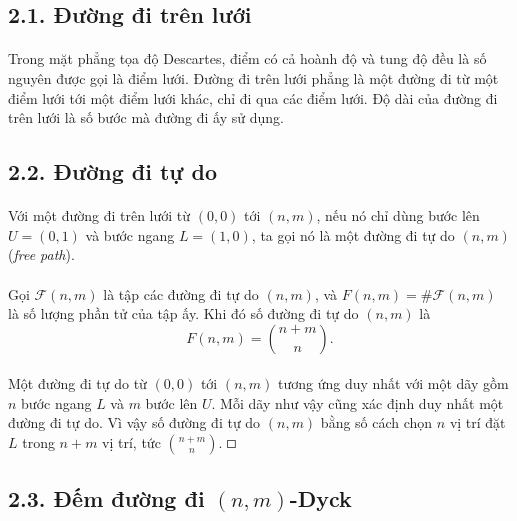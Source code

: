 \documentclass[11pt]{article}
\newcommand{\square}{\mathord{\vcenter{\hrule height .5pt
  \hbox{\vrule width .5pt height 5pt\kern5pt\vrule width .5pt}
  \hrule height .5pt}}}
\begin{document}
\subsection*{2.1. Đường đi trên lưới}

\paragraph{}
Trong mặt phẳng tọa độ Descartes, điểm có cả hoành độ và tung độ đều là số
nguyên được gọi là điểm lưới. Đường đi trên lưới phẳng là một đường đi từ một
điểm lưới tới một điểm lưới khác, chỉ đi qua các điểm lưới. Độ dài của đường
đi trên lưới là số bước mà đường đi ấy sử dụng.

\subsection*{2.2. Đường đi tự do}

\paragraph{}
Với một đường đi trên lưới từ \((0,0)\) tới \((n,m)\), nếu nó chỉ dùng bước
lên \(U=(0,1)\) và bước ngang \(L=(1,0)\), ta gọi nó là một đường đi tự do
\((n,m)\) (\emph{free path}).

\paragraph{}
Gọi \(\mathcal F(n,m)\) là tập các đường đi tự do \((n,m)\), và
\(F(n,m)=\#\mathcal F(n,m)\) là số lượng phần tử của tập ấy. Khi đó số đường
đi tự do \((n,m)\) là
\[
  F(n,m)=\binom{n+m}{n}. \tag{3}
\]

\paragraph{}
Một đường đi tự do từ \((0,0)\) tới \((n,m)\) tương ứng duy nhất với một dãy
gồm \(n\) bước ngang \(L\) và \(m\) bước lên \(U\). Mỗi dãy như vậy cũng xác
định duy nhất một đường đi tự do. Vì vậy số đường đi tự do \((n,m)\) bằng số
cách chọn \(n\) vị trí đặt \(L\) trong \(n+m\) vị trí, tức
\(\binom{n+m}{n}\). \(\square\)

\subsection*{2.3. Đếm đường đi \((n,m)\)-Dyck}
\end{document}
